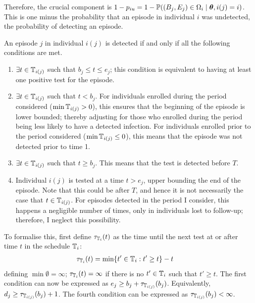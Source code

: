 \documentclass[thesis.tex]{subfiles}
\begin{document}
Therefore, the crucial component is $1 - p_{iu} = 1 - \operatorname{\mathbb{P}}((B_j, E_j) \in \Omega_i \mid \bm{\theta}, i(j) = i)$.
This is one minus the probability that an episode in individual $i$ was undetected, \ie the probability of detecting an episode.

An episode $j$ in individual $i(j)$ is detected if and only if all the following conditions are met.
\begin{enumerate}
    \item $\exists t \in \mathbb{T}_{i(j)}$ such that $b_j \leq t \leq e_j$; this condition is equivalent to having at least one positive test for the episode.
    \item $\exists t \in \mathbb{T}_{i(j)}$ such that $t < b_j$.
      For individuals enrolled during the period considered ($\min \mathbb{T}_{i(j)} > 0$), this ensures that the beginning of the episode is lower bounded; thereby adjusting for those who enrolled during the period being less likely to have a detected infection.
      For individuals enrolled prior to the period considered ($\min \mathbb{T}_{i(j)} \leq 0$), this means that the episode was not detected prior to time 1.
    \item $\exists t \in \mathbb{T}_{i(j)}$ such that $t \geq b_j$.
      This means that the test is detected before $T$.
    \item Individual $i(j)$ is tested at a time $t > e_j$, upper bounding the end of the episode.
      Note that this could be after $T$, and hence it is not necessarily the case that $t \in \mathbb{T}_{i(j)}$.
      For episodes detected in the period I consider, this happens a negligible number of times, only in individuals lost to follow-up; therefore, I neglect this possibility.
\end{enumerate}

To formalise this, first define $\tau_{\mathbb{T}_i}(t)$ as the time until the next test at or after time $t$ in the schedule $\mathbb{T}_i$:
\begin{align}
\tau_{\mathbb{T}_i}(t) &= \min \{ t' \in \mathbb{T}_i : t' \geq t \} - t
\label{perf-test:eq:tau-def}
\end{align}
defining $\min \emptyset = \infty$; \ie $\tau_{\mathbb{T}_i}(t) = \infty$ if there is no $t' \in \mathbb{T}_i$ such that $t' \geq t$.
The first condition can now be expressed as $e_j \geq b_j + \tau_{\mathbb{T}_{i(j)}}(b_j)$.
Equivalently, $d_j \geq \tau_{\mathbb{T}_{i(j)}}(b_j) + 1$.
The fourth condition can be expressed as $\tau_{\mathbb{T}_{i(j)}}(b_j) < \infty$.
\end{document}
